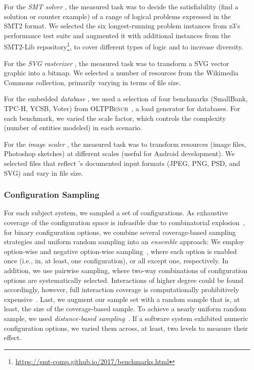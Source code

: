 {{For the \textit{SMT solver} \zdrei, the measured task was to decide the satisfiability (find a solution or counter example) of a range of logical problems expressed in the SMT2 format. We selected the six longest-running problem instances from z3’s performance test suite and augmented it with additional instances from the SMT2-Lib repository\footnote{\url{https://smt-comp.github.io/2017/benchmarks.html}}, to cover different types of logic and to increase diversity.

For the \textit{SVG rasterizer} \batik, the measured task was to transform a SVG vector graphic into a bitmap. We selected a number of resources from the Wikimedia Commons collection, primarily varying in terms of file size. 

For the embedded \textit{database} \htwo, we used a selection of four benchmarks (SmallBank, TPC-H, YCSB, Voter) from \textsc{OLTPBench}~\cite{difallah_oltp_2013}, a load generator for databases. For each benchmark, we varied the scale factor, which controls the complexity (number of entities modeled) in each scenario.

For the \textit{image scaler} \dconvert, the measured task was to transform resources (image files, Photoshop sketches) at different scales (useful for Android development). We selected files that reflect \dconvert's documented input formats (JPEG, PNG, PSD, and SVG) and vary in file size.
}

\subsubsection{Configuration Sampling}\label{sec:sampling}
For each subject system, we sampled a set of configurations. As exhaustive coverage of the configuration space is infeasible due to combinatorial explosion~\cite{henardCombining2015}, for binary configuration options, we combine several coverage-based sampling strategies and uniform random sampling into an \emph{ensemble} approach: 
We employ option-wise and negative option-wise sampling~\cite{siegmundPerformanceinfluenceModelsHighly2015}, where each option is enabled once (i.e., in, at least, one configuration), or all except one, respectively. In addition, we use pairwise sampling, where two-way combinations of configuration options are systematically selected. Interactions of higher degree could be found accordingly, however, full interaction coverage is computationally prohibitively expensive~\cite{henardCombining2015}. 
Last, we augment our sample set with a random sample that is, at least, the size of the coverage-based sample. To achieve a nearly uniform random sample, we used \emph{distance-based sampling}~\cite{kaltenecker_distance-based_2019}. If a software system exhibited numeric configuration options, we varied them across, at least, two levels to measure their effect.

}
